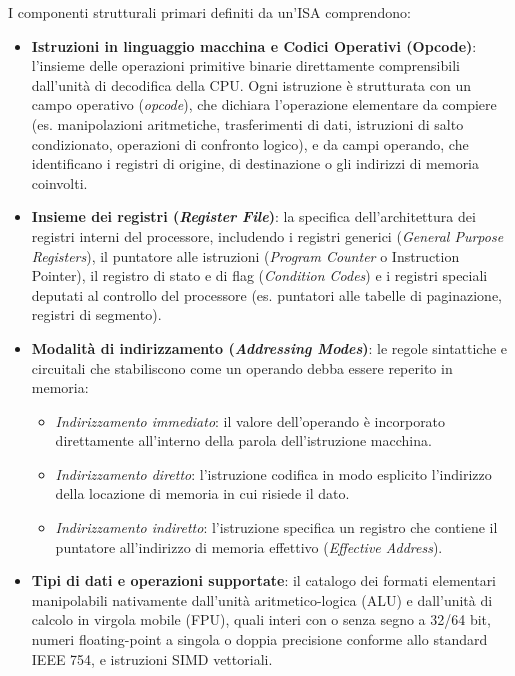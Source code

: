 \documentclass[11pt, a4paper]{article}
\begin{document}

I componenti strutturali primari definiti da un'ISA comprendono:
\begin{itemize}
    \item \textbf{Istruzioni in linguaggio macchina e Codici Operativi (Opcode)}: l'insieme delle operazioni primitive binarie direttamente comprensibili dall'unità di decodifica della CPU. Ogni istruzione è strutturata con un campo operativo (\emph{opcode}), che dichiara l'operazione elementare da compiere (es. manipolazioni aritmetiche, trasferimenti di dati, istruzioni di salto condizionato, operazioni di confronto logico), e da campi operando, che identificano i registri di origine, di destinazione o gli indirizzi di memoria coinvolti.
    \item \textbf{Insieme dei registri (\emph{Register File})}: la specifica dell'architettura dei registri interni del processore, includendo i registri generici (\emph{General Purpose Registers}), il puntatore alle istruzioni (\emph{Program Counter} o Instruction Pointer), il registro di stato e di flag (\emph{Condition Codes}) e i registri speciali deputati al controllo del processore (es. puntatori alle tabelle di paginazione, registri di segmento).
    \item \textbf{Modalità di indirizzamento (\emph{Addressing Modes})}: le regole sintattiche e circuitali che stabiliscono come un operando debba essere reperito in memoria:
    \begin{itemize}
        \item \emph{Indirizzamento immediato}: il valore dell'operando è incorporato direttamente all'interno della parola dell'istruzione macchina.
        \item \emph{Indirizzamento diretto}: l'istruzione codifica in modo esplicito l'indirizzo della locazione di memoria in cui risiede il dato.
        \item \emph{Indirizzamento indiretto}: l'istruzione specifica un registro che contiene il puntatore all'indirizzo di memoria effettivo (\emph{Effective Address}).
    \end{itemize}
    \item \textbf{Tipi di dati e operazioni supportate}: il catalogo dei formati elementari manipolabili nativamente dall'unità aritmetico-logica (ALU) e dall'unità di calcolo in virgola mobile (FPU), quali interi con o senza segno a 32/64 bit, numeri floating-point a singola o doppia precisione conforme allo standard IEEE 754, e istruzioni SIMD vettoriali.

\end{itemize}
\end{document}
